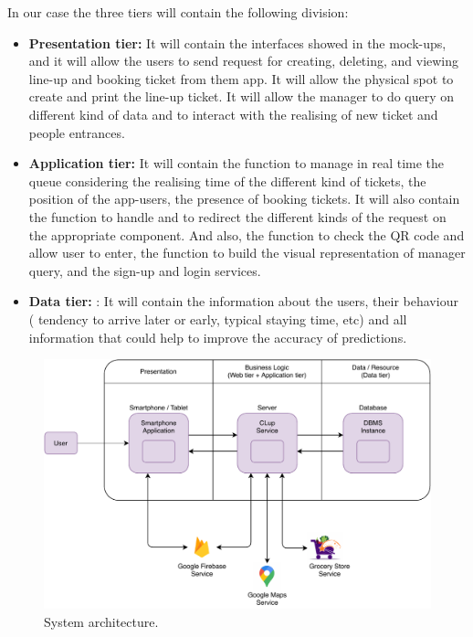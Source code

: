 In our case the three tiers will contain the following division:
\begin{itemize}
	\item \textbf{Presentation tier:} It will contain the interfaces showed in the mock-ups, and it will allow the users to send request for creating, deleting, and viewing line-up and booking ticket from them app. It will allow the physical spot to create and print the line-up ticket. It will allow the manager to do query on different kind of data and to interact with the realising of new ticket and people entrances. 

	\item \textbf{Application tier:} It will contain the function to manage in real time the queue considering the realising time of the different kind of tickets, the position of the app-users, the presence of booking tickets. It will also contain the function to handle and to redirect the different kinds of the request on the appropriate component. And also, the function to check the QR code and allow user to enter, the function to build the visual representation of manager query, and the sign-up and login services.

	\item \textbf{Data tier:} : It will contain the information about the users, their behaviour ( tendency to arrive later or early, typical staying time, etc) and all information that could help to improve the accuracy of predictions.
\end{itemize}

\begin{figure}[H]
	\centering
	\includegraphics[width=1.0\textwidth]{images/architecture.pdf}
	\caption{System architecture.}
\end{figure}

